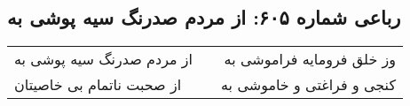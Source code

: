 \begin{center}
\section*{رباعی شماره ۶۰۵: از مردم صدرنگ سیه پوشی به}
\label{sec:sh605}
\begin{longtable}{l p{0.5cm} r}
از مردم صدرنگ سیه پوشی به
&&
وز خلق فرومایه فراموشی به
\\
از صحبت ناتمام بی خاصیتان
&&
کنجی و فراغتی و خاموشی به
\\
\end{longtable}
\end{center}
